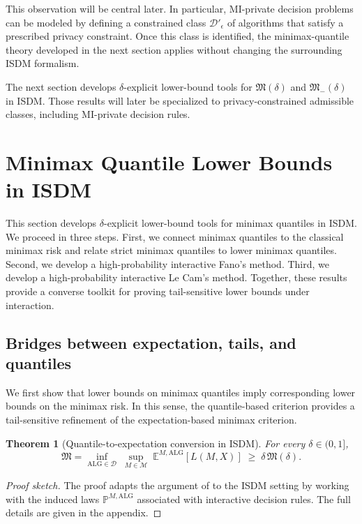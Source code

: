 \documentclass[journal]{IEEEtran}
\newtheorem{theorem}{Theorem}
\newcommand{\ALG}{\mathrm{ALG}}
\begin{document}
This  observation will be central later. In particular, MI-private decision problems can be modeled by defining a constrained class \(\mathcal D'_\epsilon\) of algorithms that satisfy a prescribed privacy constraint. Once this class is identified, the minimax-quantile theory developed in the next section applies without changing the surrounding ISDM formalism.
\fi


The next section develops \(\delta\)-explicit lower-bound tools for \(\mathfrak M(\delta)\) and \(\mathfrak M_{-}(\delta)\) in ISDM. Those results will later be specialized to privacy-constrained admissible classes, including MI-private decision rules.



\section{Minimax Quantile Lower Bounds in ISDM}
\label{sec:main-results}

This section develops \(\delta\)-explicit lower-bound tools for minimax quantiles in ISDM. We proceed in three steps. First, we connect minimax quantiles to the classical minimax risk and relate strict minimax quantiles to lower minimax quantiles. Second, we develop a high-probability interactive Fano's method. Third, we develop a high-probability interactive Le Cam's method. Together, these results provide a converse toolkit for proving tail-sensitive lower bounds under interaction.

\subsection{Bridges between expectation, tails, and quantiles}

We first show that lower bounds on minimax quantiles imply corresponding
lower bounds on the minimax risk. In this sense, the quantile-based
criterion provides a tail-sensitive refinement of the expectation-based minimax
criterion.

\begin{theorem}[Quantile-to-expectation conversion in ISDM]
\label{thm:quantile-to-expectation}
For every \(\delta\in(0,1]\),
\[
\mathfrak M
=
\inf_{\ALG\in\mathcal D}\;
\sup_{M\in\mathcal M}\;
\mathbb E^{M,\ALG}[L(M,X)]
\;\ge\;
\delta\,\mathfrak M(\delta).
\]
\end{theorem}

\begin{proof}[Proof sketch] The proof adapts the argument of \cite[Proposition~2]{ma2024high} to the ISDM
setting by working with the induced laws \(\mathbb{P}^{M,\ALG}\) associated with
interactive decision rules. The full details are given in the appendix.
\end{proof}
\end{document}
